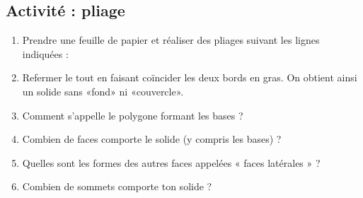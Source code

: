 
\subsection*{Activité : pliage}

\begin{enumerate}
    \item
        
Prendre une feuille de papier et réaliser des pliages suivant les lignes indiquées :

    \begin{center}
                                                  
    \end{center}  

    \item

        Refermer le tout en faisant coïncider les deux bords en gras. On obtient ainsi un solide sans «fond» ni «couvercle».

    \item

        Comment s'appelle le polygone formant les bases ?

    \item

         Combien de faces comporte le solide (y compris les bases) ?
    \item
          Quelles sont les formes des autres faces appelées « faces latérales » ?
    \item
           Combien de sommets comporte ton solide ?

\end{enumerate}
